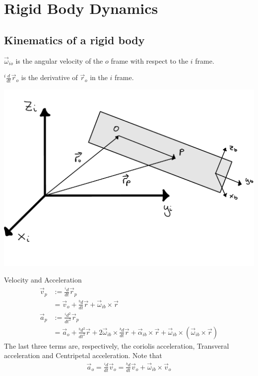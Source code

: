 \setcounter{section}{2}
\section{Rigid Body Dynamics}
\setcounter{section}{6}
\setcounter{subsection}{11}
\subsection{Kinematics of a rigid body} %
\(\vec{\omega}_{io}\) is the angular velocity of the \(o\) frame with respect to the \(i\) frame.

\({}^i\frac{d}{dt}\vec{r}_o\) is the derivative of \(\vec{r}_o\) in the \(i\) frame.

\begin{Figure}
    \includegraphics[width=\linewidth]{rigid-body.pdf}
    \label{fig:Test}
\end{Figure}

Velocity and Acceleration
\begin{align*}
    \vec{v}_p &:= \frac{{}^id}{dt}\vec{r}_p \\
              &= \vec{v}_o + \frac{{}^bd}{dt}\vec{r} + \vec{\omega}_{ib}\times\vec{r} \\
    \vec{a}_p &:= \frac{{}^id^2}{dt^2}\vec{r}_p \\
              &= \vec{a}_o + \frac{{}^bd^2}{dt^2}\vec{r} + 2\vec{\omega}_{ib}\times\frac{{}^bd}{dt}\vec{r} + \vec{\alpha}_{ib}\times\vec{r} + \vec{\omega}_{ib}\times(\vec{\omega}_{ib}\times\vec{r})
\end{align*}
The last three terms are, respectively, the coriolis acceleration, Transveral acceleration and Centripetal acceleration. Note that
\begin{align*}
    \vec{a}_o = \frac{{}^id}{dt}\vec{v}_o = \frac{{}^bd}{dt}\vec{v}_o + \vec{\omega}_{ib}\times\vec{v}_o
\end{align*}



